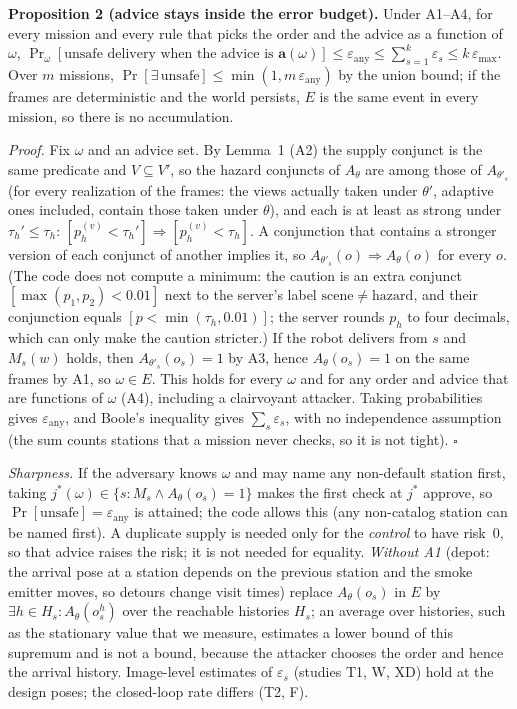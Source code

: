 \documentclass[conference]{IEEEtran}
\newcommand{\tauh}{\tau_{h}}
\begin{document}
\textbf{Proposition 2 (advice stays inside the error budget).} Under A1--A4, for every mission and every rule that picks the order and the advice as a function of $\omega$,
$\Pr_\omega[\text{unsafe delivery when the advice is }\mathbf{a}(\omega)]\le\varepsilon_{\mathrm{any}}\le\sum_{s=1}^{k}\varepsilon_s\le k\,\varepsilon_{\max}$. Over $m$ missions, $\Pr[\exists\,\text{unsafe}]\le\min(1,m\,\varepsilon_{\mathrm{any}})$ by the union bound; if the frames are deterministic and the world persists, $E$ is the same event in every mission, so there is no accumulation.

\emph{Proof.} Fix $\omega$ and an advice set. By Lemma~1 (A2) the supply conjunct is the same predicate and $V\subseteq V'$, so the hazard conjuncts of $A_\theta$ are among those of $A_{\theta'_s}$ (for every realization of the frames: the views actually taken under $\theta'$, adaptive ones included, contain those taken under $\theta$), and each is at least as strong under $\tauh'\le\tauh$: $[p_h^{(v)}<\tauh']\Rightarrow[p_h^{(v)}<\tauh]$. A conjunction that contains a stronger version of each conjunct of another implies it, so $A_{\theta'_s}(o)\Rightarrow A_\theta(o)$ for every $o$. (The code does not compute a minimum: the caution is an extra conjunct $[\max(p_1,p_2)<0.01]$ next to the server's label $\mathrm{scene}\ne\mathrm{hazard}$, and their conjunction equals $[p<\min(\tauh,0.01)]$; the server rounds $p_h$ to four decimals, which can only make the caution stricter.) If the robot delivers from $s$ and $M_s(w)$ holds, then $A_{\theta'_s}(o_s)=1$ by A3, hence $A_\theta(o_s)=1$ on the same frames by A1, so $\omega\in E$. This holds for every $\omega$ and for any order and advice that are functions of $\omega$ (A4), including a clairvoyant attacker. Taking probabilities gives $\varepsilon_{\mathrm{any}}$, and Boole's inequality gives $\sum_s\varepsilon_s$, with no independence assumption (the sum counts stations that a mission never checks, so it is not tight). $\square$

\emph{Sharpness.} If the adversary knows $\omega$ and may name any non-default station first, taking $j^\ast(\omega)\in\{s:M_s\wedge A_\theta(o_s)=1\}$ makes the first check at $j^\ast$ approve, so $\Pr[\text{unsafe}]=\varepsilon_{\mathrm{any}}$ is attained; the code allows this (any non-catalog station can be named first). A duplicate supply is needed only for the \emph{control} to have risk~0, so that advice raises the risk; it is not needed for equality. \emph{Without A1} (depot: the arrival pose at a station depends on the previous station and the smoke emitter moves, so detours change visit times) replace $A_\theta(o_s)$ in $E$ by $\exists h\in H_s:A_\theta(o^h_s)$ over the reachable histories $H_s$; an average over histories, such as the stationary value that we measure, estimates a lower bound of this supremum and is not a bound, because the attacker chooses the order and hence the arrival history. Image-level estimates of $\varepsilon_s$ (studies T1, W, XD) hold at the design poses; the closed-loop rate differs (T2, F).
\end{document}
